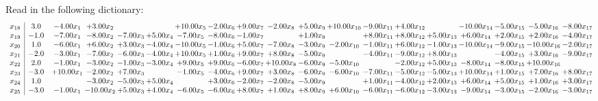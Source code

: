 \documentclass[9pt]{article}
\begin{document}
Read in the following dictionary:
\[\begin{array}{c| c c@{\hskip 2pt} c@{\hskip 2pt} c@{\hskip 2pt} c@{\hskip 2pt} c@{\hskip 2pt} c@{\hskip 2pt} c@{\hskip 2pt} c@{\hskip 2pt} c@{\hskip 2pt} c@{\hskip 2pt} c@{\hskip 2pt} c@{\hskip 2pt} c@{\hskip 2pt} c@{\hskip 2pt} c@{\hskip 2pt} c@{\hskip 2pt} c@{\hskip 2pt} }
 x_{18}   &  3.0 & -4.00 x_{1} & +  3.00 x_{2} &    &   & + 10.00 x_{5} & -2.00 x_{6} & +  9.00 x_{7} & -2.00 x_{8} & +  5.00 x_{9} & + 10.00 x_{10} & -9.00 x_{11} & +  4.00 x_{12} &   & -10.00 x_{14} & -5.00 x_{15} & -5.00 x_{16} & -8.00 x_{17}\\
 x_{19}   &  -1.0 & -7.00 x_{1} & -8.00 x_{2} & -7.00 x_{3} & +  5.00 x_{4} & -7.00 x_{5} & -8.00 x_{6} & -1.00 x_{7} &   & +  1.00 x_{9} &   & +  8.00 x_{11} & +  8.00 x_{12} & +  5.00 x_{13} & +  6.00 x_{14} & +  2.00 x_{15} & +  2.00 x_{16} & -4.00 x_{17}\\
 x_{20}   &  1.0 & -6.00 x_{1} & +  6.00 x_{2} & +  3.00 x_{3} & -4.00 x_{4} & -10.00 x_{5} & -1.00 x_{6} & +  5.00 x_{7} & -7.00 x_{8} & -3.00 x_{9} & -2.00 x_{10} & -1.00 x_{11} & +  6.00 x_{12} & -1.00 x_{13} & -10.00 x_{14} & -9.00 x_{15} & -10.00 x_{16} & -2.00 x_{17}\\
 x_{21}   &  -2.0 & -3.00 x_{1} & -7.00 x_{2} & -6.00 x_{3} & -4.00 x_{4} & + 10.00 x_{5} & +  1.00 x_{6} & +  9.00 x_{7} & +  8.00 x_{8} & -5.00 x_{9} &   & -4.00 x_{11} & -9.00 x_{12} & +  8.00 x_{13} &   & -4.00 x_{15} & +  3.00 x_{16} & -9.00 x_{17}\\
 x_{22}   &  2.0 & -1.00 x_{1} & -3.00 x_{2} & -1.00 x_{3} & -3.00 x_{4} & +  9.00 x_{5} & +  9.00 x_{6} & -6.00 x_{7} & + 10.00 x_{8} & -6.00 x_{9} & -5.00 x_{10} &   & -2.00 x_{12} & +  5.00 x_{13} & -8.00 x_{14} & -8.00 x_{15} & + 10.00 x_{16} &   \\
 x_{23}   &  -3.0 & + 10.00 x_{1} & -2.00 x_{2} & +  7.00 x_{3} &   & -1.00 x_{5} & -4.00 x_{6} & +  9.00 x_{7} & +  3.00 x_{8} & -6.00 x_{9} & -6.00 x_{10} & -7.00 x_{11} & -5.00 x_{12} & -5.00 x_{13} & + 10.00 x_{14} & +  1.00 x_{15} & +  7.00 x_{16} & +  8.00 x_{17}\\
 x_{24}   &  1.0  &   & -3.00 x_{2} & -5.00 x_{3} & +  5.00 x_{4} &   & +  3.00 x_{6} & -2.00 x_{7} & -2.00 x_{8} & -5.00 x_{9} &   & +  1.00 x_{11} & -4.00 x_{12} & +  2.00 x_{13} & +  6.00 x_{14} & +  5.00 x_{15} & +  1.00 x_{16} & +  3.00 x_{17}\\
 x_{25}   &  -3.0 & -1.00 x_{1} & -10.00 x_{2} & +  5.00 x_{3} & +  4.00 x_{4} & -6.00 x_{5} & -6.00 x_{6} & +  8.00 x_{7} & +  1.00 x_{8} & +  8.00 x_{9} & +  6.00 x_{10} & -6.00 x_{11} & -6.00 x_{12} & -3.00 x_{13} & -9.00 x_{14} & -3.00 x_{15} & -2.00 x_{16} & -3.00 x_{17}\\

\end{array}\]
\end{document}
